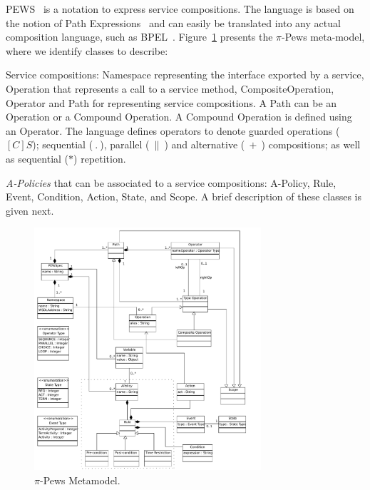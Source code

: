 PEWS~\cite{BHM06,Placido2010LTPD} is a notation to express service compositions.
The language is based on the notion of Path Expressions~\cite{And79} and can easily be translated into any actual composition language, such as BPEL~\cite{bpel03}. 
Figure~\ref{fig:PPEWSmetamodel} presents the $\pi$-{\sc Pews} meta-model, where we identify classes to describe:
\begin{itemizedTrivlist}
\item Service compositions: {\sc Namespace} representing the interface exported by a service, {\sc Operation} that represents a call to a service method, {\sc CompositeOperation}, {\sc Operator} and {\sc Path} for representing service compositions.
A {\sc Path} can be an {\sc Operation} or a {\sc Compound Operation}. 
A {\sc Compound Operation} is defined using an {\sc Operator}.
The language defines operators to denote guarded operations ($[C]S$); sequential ($\ . \ $), parallel ($\ \| \ $) and alternative ($\ + \ $) compositions; as well as sequential ($*$) repetition.

\item {\em A-Policies} that can be associated to a service compositions:  {\sc A-Policy}, {\sc Rule}, {\sc Event}, {\sc Condition}, {\sc Action}, {\sc State}, and {\sc Scope}.
A brief description of these classes is given next.
\end{itemizedTrivlist}
%
\begin{figure}[t]
\centering
\includegraphics[width=0.75\textwidth]{figs/PEWSMetamodel}
\caption{$\pi$-{\sc Pews} Metamodel.}
\label{fig:PPEWSmetamodel}
\end{figure}

